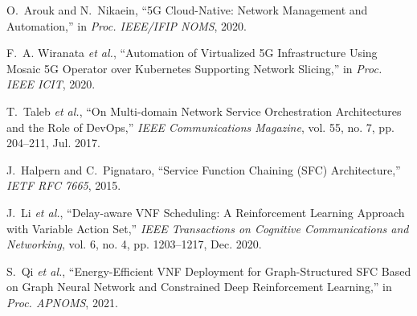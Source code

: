 \documentclass[conference]{IEEEtran}
\begin{document}
	\begin{thebibliography}{99}
		
		O.~Arouk and N.~Nikaein, ``5G Cloud-Native: Network Management and Automation,'' in \textit{Proc. IEEE/IFIP NOMS}, 2020.
		
		F.~A. Wiranata \textit{et al.}, ``Automation of Virtualized 5G Infrastructure Using Mosaic 5G Operator over Kubernetes Supporting Network Slicing,'' in \textit{Proc. IEEE ICIT}, 2020.
		
		T.~Taleb \textit{et al.}, ``On Multi-domain Network Service Orchestration Architectures and the Role of DevOps,'' \textit{IEEE Communications Magazine}, vol. 55, no. 7, pp. 204--211, Jul. 2017.
		
		J.~Halpern and C.~Pignataro, ``Service Function Chaining (SFC) Architecture,'' \textit{IETF RFC 7665}, 2015.
		
		J.~Li \textit{et al.}, ``Delay-aware VNF Scheduling: A Reinforcement Learning Approach with Variable Action Set,'' \textit{IEEE Transactions on Cognitive Communications and Networking}, vol. 6, no. 4, pp. 1203--1217, Dec. 2020.
		
		S.~Qi \textit{et al.}, ``Energy-Efficient VNF Deployment for Graph-Structured SFC Based on Graph Neural Network and Constrained Deep Reinforcement Learning,'' in \textit{Proc. APNOMS}, 2021.
		
	\end{thebibliography}
	
\end{document}
